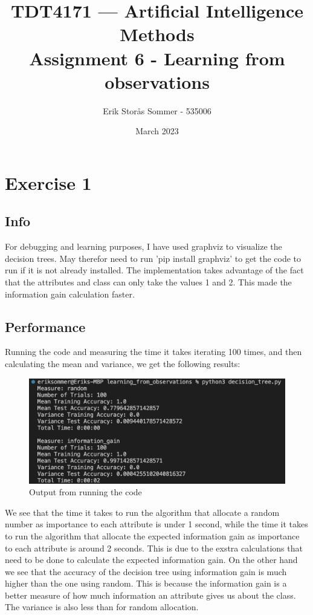 \documentclass{article}
\title{TDT4171 — Artificial Intelligence Methods \\ Assignment 6 - Learning from observations}
\author{Erik Storås Sommer - 535006}
\date{March 2023}
\begin{document}
\maketitle
\setlength{\parindent}{0pt}

\section*{Exercise 1}

\subsection*{Info}

For debugging and learning purposes, I have used graphviz to visualize the decision trees.
May therefor need to run 'pip install graphviz' to get the code to run if it is not already installed.
The implementation takes advantage of the fact that the attributes and class can only take the values 1 and 2.
This made the information gain calculation faster.

\subsection*{Performance}

Running the code and measuring the time it takes iterating 100 times, and then calculating the mean and variance, we get the following results:

\begin{figure}[h]
    \includegraphics[width=\linewidth]{output.png}
    \caption{Output from running the code}
    \label{fig:image1}
\end{figure}

We see that the time it takes to run the algorithm that allocate a random number as importance to each attribute is under 1 second, while the time it takes to run the algorithm that allocate the expected information gain as importance to each attribute is around 2 seconds.
This is due to the exstra calculations that need to be done to calculate the expected information gain.
On the other hand we see that the accuracy of the decision tree using information gain is much higher than the one using random.
This is because the information gain is a better measure of how much information an attribute gives us about the class.
The variance is also less than for random allocation.
\end{document}
